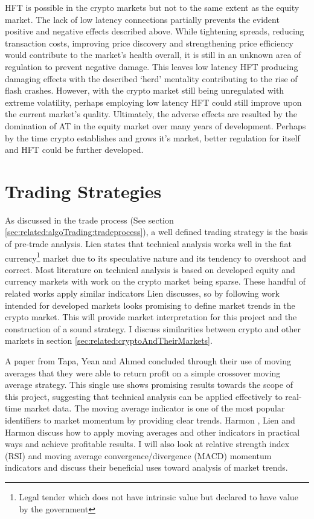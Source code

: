 HFT is possible in the crypto markets but not to the same extent as the equity market. The lack of low latency connections partially prevents the evident positive and negative effects described above. While tightening spreads, reducing transaction costs, improving price discovery and strengthening price efficiency would contribute to the market's health overall, it is still in an unknown area of regulation to prevent negative damage. This leaves low latency HFT producing damaging effects with the described `herd' mentality contributing to the rise of flash crashes.  However, with the crypto market still being unregulated with extreme volatility, perhaps employing low latency HFT could still improve upon the current market's quality. Ultimately, the adverse effects are resulted by the domination of AT in the equity market over many years of development. Perhaps by the time crypto establishes and grows it's market, better regulation for itself and HFT could be further developed.



\section{Trading Strategies}
\label{sec:related:tradingStrategies}
\noindent As discussed in the trade process (See section \ref{sec:related:algoTrading:tradeprocess}), a well defined trading strategy is the basis of pre-trade analysis. Lien \cite{BOOK:Lien:2016} states that technical analysis works well in the fiat currency\footnote{Legal tender which does not have intrinsic value but declared to have value by the government} market due to its speculative nature and its tendency to overshoot and correct.  Most literature on technical analysis is based on developed equity and currency markets with work on the crypto market being sparse. These handful of related works apply similar indicators Lien discusses, so by following work intended for developed markets looks promising to define market trends in the crypto market. This will provide market interpretation for this project and the construction of a sound strategy. I discuss similarities between crypto and other markets in section \ref{sec:related:cryptoAndTheirMarkets}.

A paper from Tapa, Yean and Ahmed \cite{ART:Tapa:2016} concluded through their use of moving averages that they were able to return profit on a simple crossover moving average strategy. This single use shows promising results towards the scope of this project, suggesting that technical analysis can be applied effectively to real-time market data. The moving average indicator is one of the most popular identifiers to market momentum by providing clear trends. Harmon \cite{BOOK:Harmon:2014}, Lien \cite{BOOK:Lien:2016} and Harmon \cite{BOOK:Harmon:2014} discuss how to apply moving averages and other indicators in practical ways and achieve profitable results. I will also look at relative strength index (RSI) and moving average convergence/divergence (MACD) momentum indicators and discuss their beneficial uses toward analysis of market trends.

